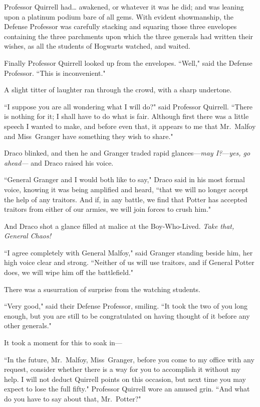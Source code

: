 Professor Quirrell had{\ldots} awakened, or whatever it was he did; and was leaning upon a platinum podium bare of all gems. With evident showmanship, the Defense Professor was carefully stacking and squaring those three envelopes containing the three parchments upon which the three generals had written their wishes, as all the students of Hogwarts watched, and waited.

Finally Professor Quirrell looked up from the envelopes. ``Well," said the Defense Professor. ``This is inconvenient."

A slight titter of laughter ran through the crowd, with a sharp undertone.

``I suppose you are all wondering what I will do?" said Professor Quirrell. ``There is nothing for it; I shall have to do what is fair. Although first there was a little speech I wanted to make, and before even that, it appears to me that Mr.~Malfoy and Miss~Granger have something they wish to share."

Draco blinked, and then he and Granger traded rapid glances---\emph{may I?}---\emph{yes, go ahead---} and Draco raised his voice.

``General Granger and I would both like to say," Draco said in his most formal voice, knowing it was being amplified and heard, ``that we will no longer accept the help of any traitors. And if, in any battle, we find that Potter has accepted traitors from either of our armies, we will join forces to crush him."

And Draco shot a glance filled at malice at the Boy-Who-Lived. \emph{Take that, General Chaos!}

``I agree completely with General Malfoy," said Granger standing beside him, her high voice clear and strong. ``Neither of us will use traitors, and if General Potter does, we will wipe him off the battlefield."

There was a susurration of surprise from the watching students.

``Very good," said their Defense Professor, smiling. ``It took the two of you long enough, but you are still to be congratulated on having thought of it before any other generals."

It took a moment for this to soak in---

``In the future, Mr.~Malfoy, Miss~Granger, before you come to my office with any request, consider whether there is a way for you to accomplish it without my help. I will not deduct Quirrell points on this occasion, but next time you may expect to lose the full fifty." Professor Quirrell wore an amused grin. ``And what do you have to say about that, Mr.~Potter?"

